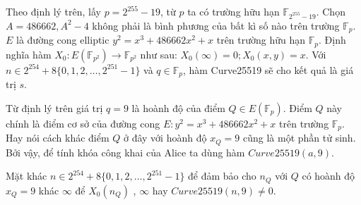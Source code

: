 \documentclass[a4paper,12pt]{report}
\begin{document}
Theo định lý trên, lấy $p = 2^{255} - 19$, từ $p$ ta có trường hữu hạn $\mathbb{F}_{2^{255}-19}$. Chọn $A = 486662,A^2 - 4$ không phải là bình phương của bất kì số nào trên trường $\mathbb{F}_p$. $E$ là đường cong elliptic $y^2 = x^3 + 486662x^2 + x$ trên trường hữu hạn $\mathbb{F}_p$. Định nghĩa hàm $X_0 : E(\mathbb{F}_{p^2} ) \rightarrow \mathbb{F}_{p^2}$ như sau: $X_0(\infty) = 0; X_0(x, y) = x$. Với $n \in 2^{254} + 8\{0, 1, 2, \ldots, 2^{251} - 1\}$ và $q \in \mathbb{F}_p$, hàm Curve25519 sẽ cho kết quả là giá trị $s$.

Từ định lý trên giá trị $q = 9$ là hoành độ của điểm $Q \in E(\mathbb{F}_p)$. Điểm $Q$ này chính là điểm cơ sở của đường cong $E : y^2 = x^3 + 486662x^2 + x$ trên trường $\mathbb{F}_p$. Hay nói cách khác điểm $Q$ ở đây với hoành độ $x_Q = 9$ cũng là một phần tử sinh. Bởi vậy, để tính khóa công khai của Alice ta dùng hàm $Curve25519(a, 9)$.

Mặt khác $n \in 2^{254} + 8\{0, 1, 2, \ldots, 2^{251} - 1\}$ để đảm bảo cho $n_Q$ với $Q$ có hoành độ $x_Q = 9$ khác $\infty$ để $X_0(n_Q)$ , $\infty$ hay $Curve25519(n, 9) \neq 0$.
\end{document}
